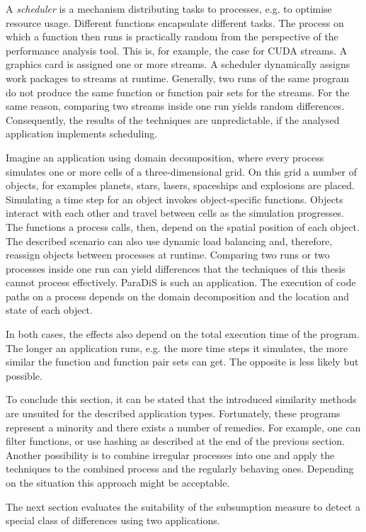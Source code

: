 \documentclass[a4paper, final, diplominf]{zih-template}
\begin{document}
A \emph{scheduler} is a mechanism distributing tasks to processes, e.g. to optimise resource usage.
Different functions encapsulate different tasks.
The process on which a function then runs is practically random from the perspective of the performance analysis tool.
This is, for example, the case for CUDA streams.
A graphics card is assigned one or more streams.
A scheduler dynamically assigns work packages to streams at runtime.
Generally, two runs of the same program do not produce the same function or function pair sets for the streams.
For the same reason, comparing two streams inside one run yields random differences.
Consequently, the results of the techniques are unpredictable, if the analysed application implements scheduling.

Imagine an application using domain decomposition, where every process simulates one or more cells of a three-dimensional grid.
On this grid a number of objects, for examples planets, stars, lasers, spaceships and explosions are placed.
Simulating a time step for an object invokes object-specific functions.
Objects interact with each other and travel between cells as the simulation progresses.
The functions a process calls, then, depend on the spatial position of each object.
The described scenario can also use dynamic load balancing and, therefore, reassign objects between processes at runtime.
Comparing two runs or two processes inside one run can yield differences that the techniques of this thesis cannot process effectively.
ParaDiS is such an application.
The execution of code paths on a process depends on the domain decomposition and the location and state of each object.

In both cases, the effects also depend on the total execution time of the program.
The longer an application runs, e.g. the more time steps it simulates, the more similar the function and function pair sets can get.
The opposite is less likely but possible.

To conclude this section, it can be stated that the introduced similarity methods are unsuited for the described application types.
Fortunately, these programs represent a minority and there exists a number of remedies.
For example, one can filter functions, or use hashing as described at the end of the previous section.
Another possibility is to combine irregular processes into one and apply the techniques to the combined process and the regularly behaving ones.
Depending on the situation this approach might be acceptable.

The next section evaluates the suitability of the subsumption measure to detect a special class of differences using two applications.
\end{document}
